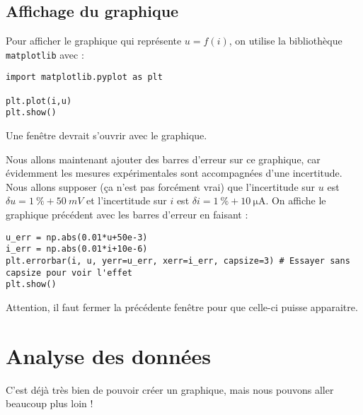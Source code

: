 \documentclass{tp}
\begin{document}
\subsection{Affichage du graphique}%
\label{sub:affichage_du_graphique}

Pour afficher le graphique qui représente $u=f(i)$, on utilise la bibliothèque \texttt{matplotlib} avec :
\begin{verbatim}
import matplotlib.pyplot as plt

plt.plot(i,u)
plt.show()
\end{verbatim}
%
Une fenêtre devrait s'ouvrir avec le graphique.

Nous allons maintenant ajouter des barres d'erreur sur ce graphique, car évidemment les mesures expérimentales sont accompagnées d'une incertitude. Nous allons supposer (ça n'est pas forcément vrai) que l'incertitude sur $u$ est $\delta u = \SI{1}{\percent}+\SI{50}{mV}$ et l'incertitude sur $i$ est $\delta i = \SI{1}{\percent}+\SI{10}{\micro\ampere}$. On affiche le graphique précédent avec les barres d'erreur en faisant :
%
\begin{verbatim}
u_err = np.abs(0.01*u+50e-3)
i_err = np.abs(0.01*i+10e-6)
plt.errorbar(i, u, yerr=u_err, xerr=i_err, capsize=3) # Essayer sans capsize pour voir l'effet
plt.show()
\end{verbatim}
%
Attention, il faut fermer la précédente fenêtre pour que celle-ci puisse apparaitre.

\section{Analyse des données}%
C'est déjà très bien de pouvoir créer un graphique, mais nous pouvons aller beaucoup plus loin ! 

\label{sec:analyse_des_donnees}
\end{document}
